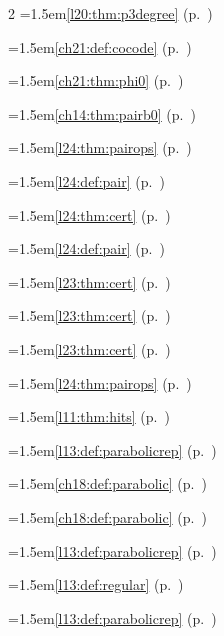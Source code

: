 \begin{multicols}{2}
\hangindent=1.5em\quad \ref{l20:thm:p3degree} (p.~\pageref{l20:thm:p3degree})\par
\hangindent=1.5em\quad \ref{ch21:def:cocode} (p.~\pageref{ch21:def:cocode})\par
\hangindent=1.5em\quad \ref{ch21:thm:phi0} (p.~\pageref{ch21:thm:phi0})\par
\hangindent=1.5em\quad \ref{ch14:thm:pairb0} (p.~\pageref{ch14:thm:pairb0})\par
\hangindent=1.5em\quad \ref{l24:thm:pairops} (p.~\pageref{l24:thm:pairops})\par
\hangindent=1.5em\quad \ref{l24:def:pair} (p.~\pageref{l24:def:pair})\par
\hangindent=1.5em\quad \ref{l24:thm:cert} (p.~\pageref{l24:thm:cert})\par
\hangindent=1.5em\quad \ref{l24:def:pair} (p.~\pageref{l24:def:pair})\par
\hangindent=1.5em\quad \ref{l23:thm:cert} (p.~\pageref{l23:thm:cert})\par
\hangindent=1.5em\quad \ref{l23:thm:cert} (p.~\pageref{l23:thm:cert})\par
\hangindent=1.5em\quad \ref{l23:thm:cert} (p.~\pageref{l23:thm:cert})\par
\hangindent=1.5em\quad \ref{l24:thm:pairops} (p.~\pageref{l24:thm:pairops})\par
\hangindent=1.5em\quad \ref{l11:thm:hits} (p.~\pageref{l11:thm:hits})\par
\hangindent=1.5em\quad \ref{l13:def:parabolicrep} (p.~\pageref{l13:def:parabolicrep})\par
\hangindent=1.5em\quad \ref{ch18:def:parabolic} (p.~\pageref{ch18:def:parabolic})\par
\hangindent=1.5em\quad \ref{ch18:def:parabolic} (p.~\pageref{ch18:def:parabolic})\par
\hangindent=1.5em\quad \ref{l13:def:parabolicrep} (p.~\pageref{l13:def:parabolicrep})\par
\hangindent=1.5em\quad \ref{l13:def:regular} (p.~\pageref{l13:def:regular})\par
\hangindent=1.5em\quad \ref{l13:def:parabolicrep} (p.~\pageref{l13:def:parabolicrep})\par

\end{multicols}
